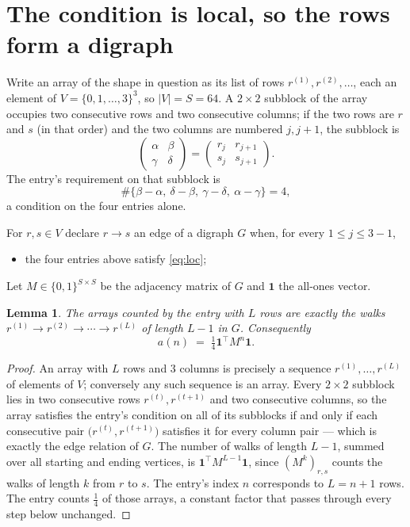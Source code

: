 \documentclass[11pt,a4paper]{article}
\theoremstyle{plain}
\newtheorem{lemma}[theorem]{Lemma}
\theoremstyle{definition}
\begin{document}
\section{The condition is local, so the rows form a digraph}

Write an array of the shape in question as its list of rows
$r^{(1)},r^{(2)},\dots$, each an element of
$V=\{0,1,\dots,3\}^{3}$, so $|V|=S=64$. A $2\times2$ subblock of the array
occupies two consecutive rows and two consecutive columns; if the two rows are $r$
and $s$ (in that order) and the two columns are numbered $j,j+1$,
the subblock is
\[
\begin{pmatrix}\alpha&\beta\\\gamma&\delta\end{pmatrix}=\begin{pmatrix}r_j&r_{j+1}\\s_j&s_{j+1}\end{pmatrix}.
\]
The entry's requirement on that subblock is
\begin{equation}\label{eq:loc}
\#\{\beta-\alpha,\ \delta-\beta,\ \gamma-\delta,\ \alpha-\gamma\}=4,
\end{equation}
a condition on the four entries alone.

For $r,s\in V$ declare $r\to s$ an edge of a digraph $G$ when, for every
$1\le j\le 3-1$,
\begin{itemize}
\item the four entries above satisfy \eqref{eq:loc};

\end{itemize}
Let $M\in\{0,1\}^{S\times S}$ be the adjacency matrix of $G$ and $\mathbf{1}$ the
all-ones vector.

\begin{lemma}\label{lem:walk}
The arrays counted by the entry with $L$ rows are exactly the walks
$r^{(1)}\to r^{(2)}\to\cdots\to r^{(L)}$ of length $L-1$ in $G$. Consequently
\[
a(n)\;=\;\tfrac1{4}\mathbf{1}^{\!\top}M^{n}\mathbf{1} .
\]
\end{lemma}

\begin{proof}
An array with $L$ rows and $3$ columns is precisely a sequence
$r^{(1)},\dots,r^{(L)}$ of elements of $V$; conversely any such sequence is an array.
Every $2\times2$ subblock lies in two consecutive rows $r^{(t)},r^{(t+1)}$ and two
consecutive columns, so the array satisfies the entry's condition on all of its subblocks
if and only if each consecutive pair $\bigl(r^{(t)},r^{(t+1)}\bigr)$ satisfies it for
every column pair --- which is exactly the edge relation of $G$. The number of walks of
length $L-1$, summed over all starting and ending vertices, is
$\mathbf{1}^{\!\top}M^{L-1}\mathbf{1}$, since $(M^{k})_{r,s}$ counts the walks of
length $k$ from $r$ to $s$. The entry's index $n$ corresponds to $L=n+1$ rows. The entry counts $\tfrac1{4}$ of those arrays, a constant factor that passes through every step below unchanged.
\end{proof}
\end{document}
